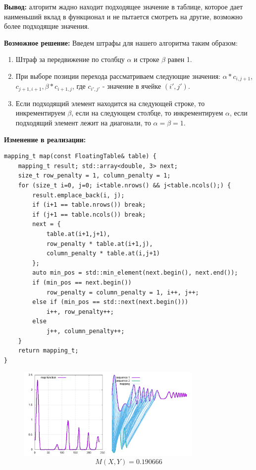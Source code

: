 \documentclass[12pt]{article}
\begin{document}
    \textbf{Вывод:} алгоритм жадно находит подходящее значение в таблице,
    которое дает наименьший вклад в функционал и не пытается смотреть на
    другие, возможно более подходящие значения.

    \textbf{Возможное решение:} Введем штрафы для нашего алгоритма таким
    образом:
    \begin{enumerate}
        \item Штраф за передвижение по столбцу $\alpha$ и строке $\beta$ равен 1.
        \item При выборе позиции перехода рассматриваем следующие значения:
            $\alpha * c_{i, j+1}$, $c_{j+1,i+1}, \beta * c_{i+1, j}$, где $c_{i',j'}$ -
            значение в ячейке $(i', j')$.
        \item Если подходящий элемент находится на следующей строке, то инкрементируем $\beta$,
            если на следующем столбце, то инкрементируем $\alpha$,
            если подходящий элемент лежит на диагонали, то $\alpha = \beta = 1$.
    \end{enumerate}

\newpage
    \textbf{Изменение в реализации:}
    \begin{lstlisting}
mapping_t map(const FloatingTable& table) {
    mapping_t result; std::array<double, 3> next;
    size_t row_penalty = 1, column_penalty = 1;
    for (size_t i=0, j=0; i<table.nrows() && j<table.ncols();) {
        result.emplace_back(i, j);
        if (i+1 == table.nrows()) break;
        if (j+1 == table.ncols()) break;
        next = {
            table.at(i+1,j+1),
            row_penalty * table.at(i+1,j),
            column_penalty * table.at(i,j+1)
        };
        auto min_pos = std::min_element(next.begin(), next.end());
        if (min_pos == next.begin())
            row_penalty = column_penalty = 1, i++, j++;
        else if (min_pos == std::next(next.begin()))
            i++, row_penalty++;
        else
            j++, column_penalty++;
    }
    return mapping_t;
}
    \end{lstlisting}

    \begin{figure}[h]
        \centering
        \includegraphics[scale=1.2, width=0.8\textwidth, height=0.4\textwidth]{cont2}
        $$M(X, Y) = 0.190666$$
    \end{figure}
\end{document}
